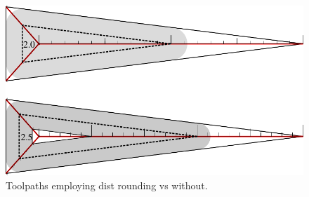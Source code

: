 \begin{figure}[H]
\includegraphics[width=\columnwidth]{sources/method/rounded_vs_unrounded.pdf}
\caption{Toolpaths employing dist rounding vs without.}
\label{rounded_vs_unrounded}
\end{figure}






















